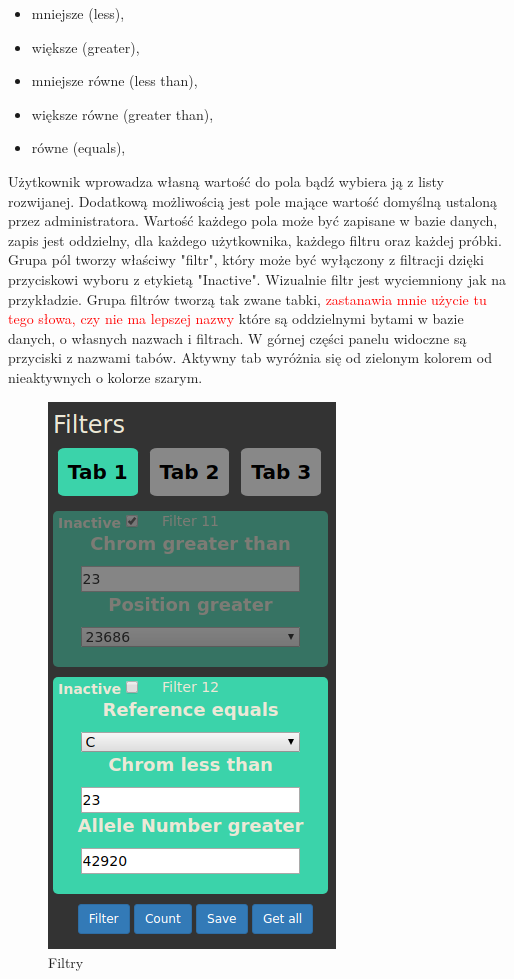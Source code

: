 \documentclass[a4paper,12pt,twoside]{article}
\begin{document}
\begin{itemize}
\item mniejsze (less),
\item większe (greater),
\item mniejsze równe (less than),
\item większe równe (greater than),
\item równe (equals),
\end{itemize} 

Użytkownik wprowadza własną wartość do pola bądź wybiera ją z listy rozwijanej.   
Dodatkową możliwością jest pole mające wartość domyślną ustaloną przez administratora. 
Wartość każdego pola może być zapisane w bazie danych, zapis jest oddzielny, dla każdego 
użytkownika, każdego filtru oraz każdej próbki.
Grupa pól tworzy właściwy "filtr", który może być wyłączony z filtracji dzięki
przyciskowi wyboru z etykietą "Inactive". Wizualnie filtr jest wyciemniony jak na przykładzie.
Grupa filtrów tworzą tak zwane tabki, \textcolor{red}{zastanawia mnie użycie tu tego słowa, czy nie ma lepszej nazwy} które są oddzielnymi bytami w bazie danych, o własnych nazwach i filtrach.
W górnej części panelu widoczne są przyciski z nazwami tabów. Aktywny tab
wyróżnia się od zielonym kolorem od nieaktywnych o kolorze szarym. 

\begin{figure}
  \centering
  \includegraphics{obrazy/aplikacja/filters.png}
  \caption{Filtry}
  \label{fig:filterspic}
\end{figure}
\end{document}
